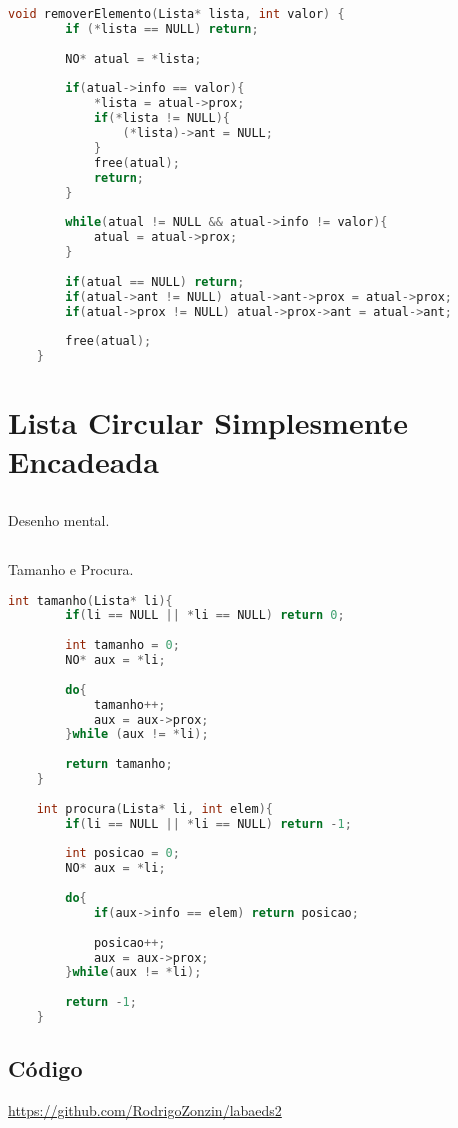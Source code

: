\begin{lstlisting}[language=C]
	void removerElemento(Lista* lista, int valor) {
		if (*lista == NULL) return;
		
		NO* atual = *lista;
		
		if(atual->info == valor){
			*lista = atual->prox; 
			if(*lista != NULL){
				(*lista)->ant = NULL;
			}
			free(atual); 
			return;
		}
		
		while(atual != NULL && atual->info != valor){
			atual = atual->prox;
		}
		
		if(atual == NULL) return;
		if(atual->ant != NULL) atual->ant->prox = atual->prox;
		if(atual->prox != NULL) atual->prox->ant = atual->ant;
		
		free(atual); 
	}
\end{lstlisting}

\section{Lista Circular Simplesmente Encadeada}
\subsection{} Desenho mental. 
\subsection{} Tamanho e Procura.
\begin{lstlisting}[language=C]
	int tamanho(Lista* li){
		if(li == NULL || *li == NULL) return 0;
		
		int tamanho = 0;
		NO* aux = *li;
		
		do{
			tamanho++;
			aux = aux->prox;
		}while (aux != *li);
		
		return tamanho;
	}
	
	int procura(Lista* li, int elem){
		if(li == NULL || *li == NULL) return -1;
		
		int posicao = 0;
		NO* aux = *li;
		
		do{
			if(aux->info == elem) return posicao;
			
			posicao++;
			aux = aux->prox;
		}while(aux != *li);
		
		return -1; 
	}
\end{lstlisting}

\subsection{Código}

\href{https://github.com/RodrigoZonzin/labaeds2}{https://github.com/RodrigoZonzin/labaeds2}